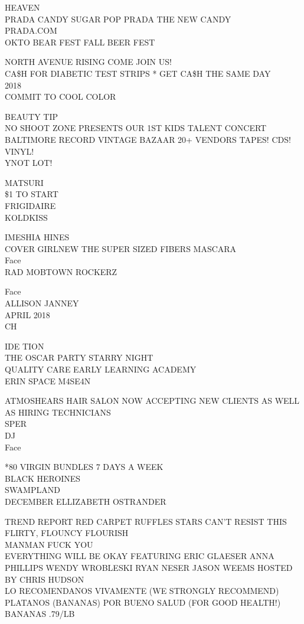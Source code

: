 \documentclass[10pt,letterpaper]{article}
\begin{document}
HEAVEN\\
PRADA CANDY SUGAR POP PRADA THE NEW CANDY\\
PRADA.COM\\
OKTO BEAR FEST FALL BEER FEST

NORTH AVENUE RISING COME JOIN US!\\
CA\$H FOR DIABETIC TEST STRIPS * GET CA\$H THE SAME DAY\\
2018\\
COMMIT TO COOL COLOR

BEAUTY TIP\\
NO SHOOT ZONE PRESENTS OUR 1ST KIDS TALENT CONCERT\\
BALTIMORE RECORD VINTAGE BAZAAR 20+ VENDORS TAPES!  CDS!  VINYL!\\
YNOT LOT!

MATSURI\\
\$1 TO START\\
FRIGIDAIRE\\
KOLDKISS

IMESHIA HINES\\
COVER GIRLNEW THE SUPER SIZED FIBERS MASCARA\\
Face\\
RAD MOBTOWN ROCKERZ

Face\\
ALLISON JANNEY\\
APRIL 2018\\
CH

IDE TION\\
THE OSCAR PARTY STARRY NIGHT\\
QUALITY CARE EARLY LEARNING ACADEMY\\
ERIN SPACE M4SE4N

ATMOSHEARS HAIR SALON NOW ACCEPTING NEW CLIENTS AS WELL AS HIRING TECHNICIANS\\
SPER\\
DJ\\
Face

*80 VIRGIN BUNDLES 7 DAYS A WEEK\\
BLACK HEROINES\\
SWAMPLAND\\
DECEMBER ELLIZABETH OSTRANDER

TREND REPORT RED CARPET RUFFLES STARS CAN'T RESIST THIS FLIRTY, FLOUNCY FLOURISH\\
MANMAN FUCK YOU\\
EVERYTHING WILL BE OKAY FEATURING ERIC GLAESER ANNA PHILLIPS WENDY WROBLESKI RYAN NESER JASON WEEMS HOSTED BY CHRIS HUDSON\\
LO RECOMENDANOS VIVAMENTE (WE STRONGLY RECOMMEND) PLATANOS (BANANAS) POR BUENO SALUD (FOR GOOD HEALTH!) BANANAS .79/LB
\end{document}
